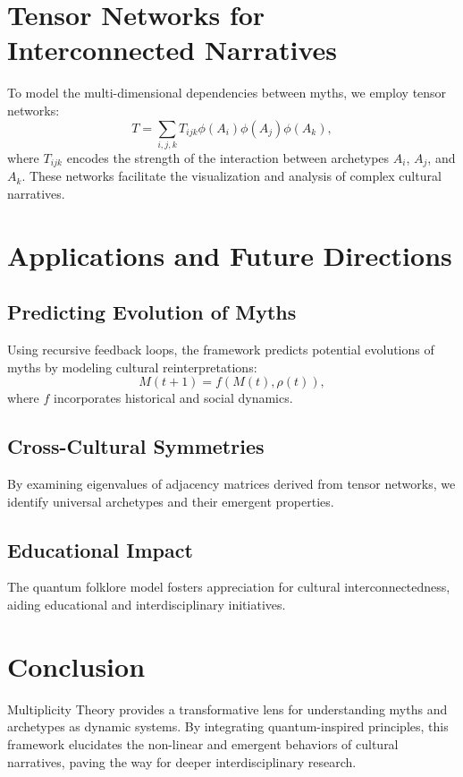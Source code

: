 \documentclass{article}
\theoremstyle{plain}
\begin{document}
\section{Tensor Networks for Interconnected Narratives}
To model the multi-dimensional dependencies between myths, we employ tensor networks:\newline
\begin{equation}
T = \sum_{i,j,k} T_{ijk} \phi(A_i) \phi(A_j) \phi(A_k),
\end{equation}
where $T_{ijk}$ encodes the strength of the interaction between archetypes $A_i$, $A_j$, and $A_k$. These networks facilitate the visualization and analysis of complex cultural narratives.

\section{Applications and Future Directions}

\subsection{Predicting Evolution of Myths}
Using recursive feedback loops, the framework predicts potential evolutions of myths by modeling cultural reinterpretations:\newline
\begin{equation}
M(t+1) = f(M(t), \rho(t)),
\end{equation}
where $f$ incorporates historical and social dynamics.

\subsection{Cross-Cultural Symmetries}
By examining eigenvalues of adjacency matrices derived from tensor networks, we identify universal archetypes and their emergent properties.

\subsection{Educational Impact}
The quantum folklore model fosters appreciation for cultural interconnectedness, aiding educational and interdisciplinary initiatives.

\section{Conclusion}
Multiplicity Theory provides a transformative lens for understanding myths and archetypes as dynamic systems. By integrating quantum-inspired principles, this framework elucidates the non-linear and emergent behaviors of cultural narratives, paving the way for deeper interdisciplinary research.

\nocite{*}


\end{document}
